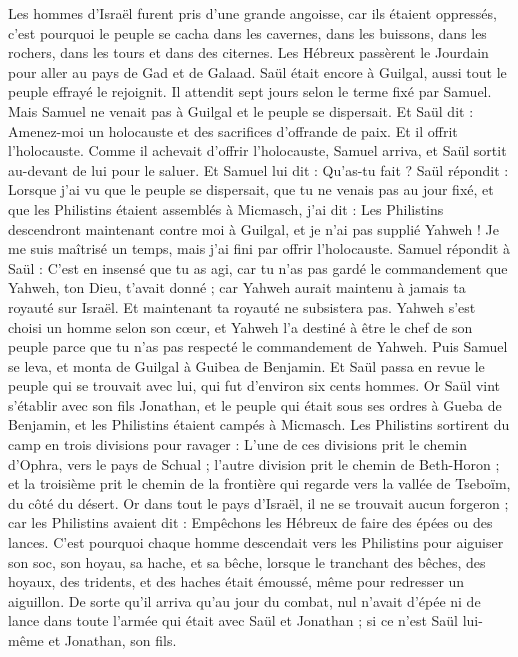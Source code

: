 \begin{multicols}{2}
Les hommes d'Israël furent pris d’une grande angoisse, car ils étaient oppressés, c'est pourquoi le peuple se cacha dans les cavernes, dans les buissons, dans les rochers, dans les tours et dans des citernes.
Les Hébreux passèrent le Jourdain pour aller au pays de Gad et de Galaad. Saül était encore à Guilgal, aussi tout le peuple effrayé le rejoignit.
Il attendit sept jours selon le terme fixé par Samuel. Mais Samuel ne venait pas à Guilgal et le peuple se dispersait.
Et Saül dit : Amenez-moi un holocauste et des sacrifices d’offrande de paix. Et il offrit l'holocauste.
Comme il achevait d'offrir l'holocauste, Samuel arriva, et Saül sortit au-devant de lui pour le saluer.
Et Samuel lui dit : Qu'as-tu fait ? Saül répondit : Lorsque j’ai vu que le peuple se dispersait, que tu ne venais pas au jour fixé, et que les Philistins étaient assemblés à Micmasch,
j'ai dit : Les Philistins descendront maintenant contre moi à Guilgal, et je n'ai pas supplié Yahweh ! Je me suis maîtrisé un temps, mais j'ai fini par offrir l'holocauste.
Samuel répondit à Saül : C’est en insensé que tu as agi, car tu n'as pas gardé le commandement que Yahweh, ton Dieu, t'avait donné ; car Yahweh aurait maintenu à jamais ta royauté sur Israël.
Et maintenant ta royauté ne subsistera pas. Yahweh s'est choisi un homme selon son cœur, et Yahweh l’a destiné à être le chef de son peuple parce que tu n'as pas respecté le commandement de Yahweh.
Puis Samuel se leva, et monta de Guilgal à Guibea de Benjamin. Et Saül passa en revue le peuple qui se trouvait avec lui, qui fut d'environ six cents hommes.
Or Saül vint s’établir avec son fils Jonathan, et le peuple qui était sous ses ordres à Gueba de Benjamin, et les Philistins étaient campés à Micmasch.
Les Philistins sortirent du camp en trois divisions pour ravager : L'une de ces divisions prit le chemin d’Ophra, vers le pays de Schual ;
l'autre division prit le chemin de Beth-Horon ; et la troisième prit le chemin de la frontière qui regarde vers la vallée de Tseboïm, du côté du désert.
Or dans tout le pays d'Israël, il ne se trouvait aucun forgeron ; car les Philistins avaient dit : Empêchons les Hébreux de faire des épées ou des lances.
C'est pourquoi chaque homme descendait vers les Philistins pour aiguiser son soc, son hoyau, sa hache, et sa bêche,
lorsque le tranchant des bêches, des hoyaux, des tridents, et des haches était émoussé, même pour redresser un aiguillon.
De sorte qu’il arriva qu’au jour du combat, nul n’avait d’épée ni de lance dans toute l’armée qui était avec Saül et Jonathan ; si ce n’est Saül lui-même et Jonathan, son fils.

\end{multicols}
